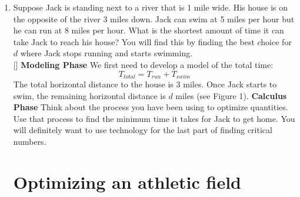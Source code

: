 \documentclass[10pt]{article}
\begin{document}
\begin{enumerate}
\begin{enumerate}
\item If the car is $40$m from the start at $t=5$ seconds, how far from the start is the car at $t=15$ seconds?
\vfill
    \end{enumerate}

\newpage
\section{Optimizing a run/swim}
\item Suppose Jack is standing next to a river that is 1 mile wide. His house is on the opposite of the river 3 miles down. Jack can swim at 5 miles per hour but he can run at 8 miles per hour. What is the shortest amount of time it can take Jack to reach his house? You will find this by finding the best choice for $d$ where Jack stops running and starts swimming.\\
[]{
{\bf Modeling Phase} We first need to develop a model of the total time: $$T_{total}=T_{run}+T_{swim}$$
The total horizontal distance to the house is $3$ miles.  Once Jack starts to swim, the remaining horizontal distance is $d$ miles (see Figure 1). 
}{
}
{\bf Calculus Phase} Think about the process you have been using to optimize quantities. Use that process to find the minimum time it takes for Jack to get home. You will definitely want to use technology for the last part of finding critical numbers.


    \vfill



\newpage

\section{Optimizing an athletic field}


\end{enumerate}
\end{document}
